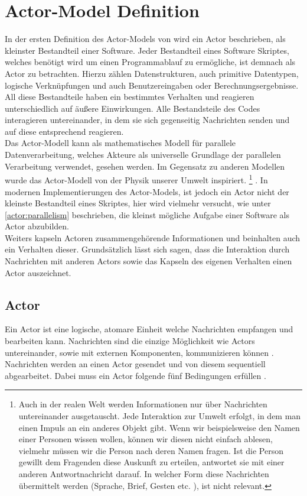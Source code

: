 \section{Actor-Model Definition}\label{actor:definition}
In der ersten Definition des Actor-Models von \citep{hewitt1973session} wird ein Actor beschrieben, als kleinster Bestandteil einer Software. Jeder Bestandteil eines Software Skriptes, welches benötigt wird um einen Programmablauf zu ermögliche, ist demnach als Actor zu betrachten. Hierzu zählen Datenstrukturen, auch primitive Datentypen, logische Verknüpfungen und auch Benutzereingaben oder Berechnungsergebnisse. All diese Bestandteile haben ein bestimmtes Verhalten und reagieren unterschiedlich auf äußere Einwirkungen. Alle Bestandsteile des Codes interagieren untereinander, in dem sie sich gegenseitig Nachrichten senden und auf diese entsprechend reagieren.\\
Das Actor-Modell kann als mathematisches Modell für parallele Datenverarbeitung, welches Akteure als universelle Grundlage der parallelen Verarbeitung verwendet, gesehen werden. Im Gegensatz zu anderen Modellen wurde das Actor-Modell von der Physik unserer Umwelt inspiriert. \footnote{Auch in der realen Welt werden Informationen nur über Nachrichten untereinander ausgetauscht. Jede Interaktion zur Umwelt erfolgt, in dem man einen Impuls an ein anderes Objekt gibt. Wenn wir beispielsweise den Namen einer Personen wissen wollen, können wir diesen nicht einfach ablesen, vielmehr müssen wir die Person nach deren Namen fragen. Ist die Person gewillt dem Fragenden diese Auskunft zu erteilen, antwortet sie mit einer anderen Antwortnachricht darauf. In welcher Form diese Nachrichten übermittelt werden (Sprache, Brief, Gesten etc. ), ist nicht relevant.} \citep{Vernon2015ReactiveAkka} .  In modernen Implementierungen des Actor-Models, ist jedoch ein Actor nicht der kleinste Bestandteil eines Skriptes, hier wird vielmehr versucht, wie unter \ref{actor:parallelism}  beschrieben, die kleinst mögliche Aufgabe einer Software als Actor abzubilden. \\
Weiters kapseln Actoren zusammengehörende Informationen und beinhalten auch ein Verhalten dieser.  Grundsätzlich lässt sich sagen, dass die Interaktion durch Nachrichten mit anderen Actors sowie das Kapseln des eigenen Verhalten einen Actor auszeichnet.

\subsection{Actor}
Ein Actor ist eine logische, atomare Einheit welche Nachrichten empfangen und bearbeiten kann. Nachrichten sind die einzige Möglichkeit wie Actors untereinander, sowie mit externen Komponenten, kommunizieren können \citep{Agha1985ConcurrentParallelism}. Nachrichten werden an einen Actor gesendet und von diesem sequentiell abgearbeitet. Dabei muss ein Actor folgende fünf Bedingungen erfüllen \citep{Agha1985ConcurrentParallelism}.

